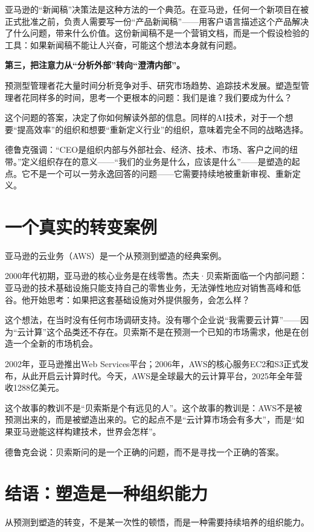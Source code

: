 亚马逊的“新闻稿”决策法是这种方法的一个典范。在亚马逊，任何一个新项目在被正式批准之前，负责人需要写一份“产品新闻稿”——用客户语言描述这个产品解决了什么问题，带来什么价值。这份新闻稿不是一个营销文档，而是一个假设检验的工具：如果新闻稿不能让人兴奋，可能这个想法本身就有问题。

\textbf{第三，把注意力从“分析外部”转向“澄清内部”。}

预测型管理者花大量时间分析竞争对手、研究市场趋势、追踪技术发展。塑造型管理者花同样多的时间，思考一个更根本的问题：我们是谁？我们要成为什么？

这个问题的答案，决定了你如何解读外部的信息。同样的AI技术，对于一个想要“提高效率”的组织和想要“重新定义行业”的组织，意味着完全不同的战略选择。

德鲁克强调：“CEO是组织内部与外部社会、经济、技术、市场、客户之间的纽带。”定义组织存在的意义——“我们的业务是什么，应该是什么”——是塑造的起点。它不是一个可以一劳永逸回答的问题——它需要持续地被重新审视、重新定义。


\section{一个真实的转变案例}


亚马逊的云业务（AWS）是一个从预测到塑造的经典案例。

2000年代初期，亚马逊的核心业务是在线零售。杰夫·贝索斯面临一个内部问题：亚马逊的技术基础设施只能支持自己的零售业务，无法弹性地应对销售高峰和低谷。他开始思考：如果把这套基础设施对外提供服务，会怎么样？

这个想法，在当时没有任何市场调研支持。没有哪个企业说“我需要云计算”——因为“云计算”这个品类还不存在。贝索斯不是在预测一个已知的市场需求，他是在创造一个全新的市场机会。

2002年，亚马逊推出Web Services平台；2006年，AWS的核心服务EC2和S3正式发布，从此开启云计算时代。今天，AWS是全球最大的云计算平台，2025年全年营收1288亿美元。

这个故事的教训不是“贝索斯是个有远见的人”。这个故事的教训是：AWS不是被预测出来的，而是被塑造出来的。它的起点不是“云计算市场会有多大”，而是“如果亚马逊能这样构建技术，世界会怎样”。

德鲁克会说：贝索斯问的是一个正确的问题，而不是寻找一个正确的答案。


\section{结语：塑造是一种组织能力}


从预测到塑造的转变，不是某一次性的顿悟，而是一种需要持续培养的组织能力。

